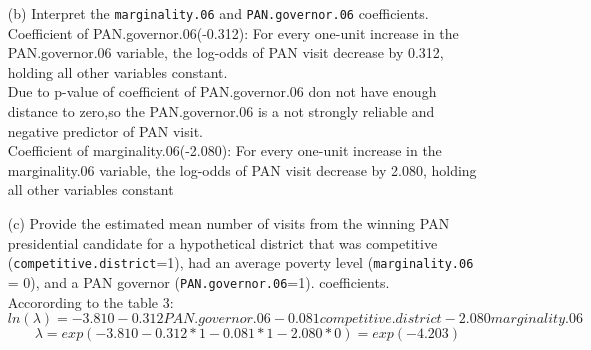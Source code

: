 \documentclass[12pt,letterpaper]{article}
\begin{document}
\begin{enumerate}
	\pagebreak
	\item [(b)]
	Interpret the \texttt{marginality.06} and \texttt{PAN.governor.06} coefficients.\vspace{.5cm}\\
	Coefficient of PAN.governor.06(-0.312): For every one-unit increase in the PAN.governor.06  variable, the log-odds of PAN visit decrease by 0.312, holding all other variables constant.\\
	Due to p-value of coefficient of PAN.governor.06 don not have enough distance to zero,so the PAN.governor.06 is a not strongly  reliable and negative predictor of PAN visit.\vspace{.25cm}\\
	Coefficient of marginality.06(-2.080): For every one-unit increase in the marginality.06  variable, the log-odds of PAN visit decrease by 2.080, holding all other variables constant
	\item [(c)]
	Provide the estimated mean number of visits from the winning PAN presidential candidate for a hypothetical district that was competitive (\texttt{competitive.district}=1), had an average poverty level (\texttt{marginality.06} = 0), and a PAN governor (\texttt{PAN.governor.06}=1).
	coefficients.\vspace{.5cm}\\
	Accorording to the table 3:
	\begin{equation}
ln(\lambda)=-3.810-0.312PAN.governor.06-0.081competitive.district-2.080marginality.06
	\end{equation}
	\begin{equation}
\lambda=exp(-3.810-0.312*1-0.081*1-2.080*0)=exp(-4.203)
	\end{equation}
	
\end{enumerate}
\end{document}
